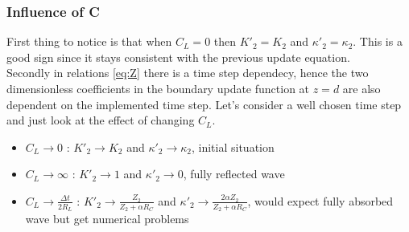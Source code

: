 \subsubsection{Influence of C}

First thing to notice is that when $C_{L} = 0$ then $K'_{2} = K_{2}$ and $\kappa'_{2} = \kappa_{2}$. This is a good
sign since it stays consistent with the previous update equation.\\
Secondly in relations \ref{eq:Z} there is a time step dependecy, hence the two dimensionless
coefficients in the boundary update function at $z=d$ are also dependent on the implemented time step. Let's consider a
well chosen time step and just look at the effect of changing $C_{L}$.
\begin{itemize}
    \item $C_{L} \rightarrow 0$ :
        $K'_{2} \rightarrow K_{2}$ and $\kappa'_{2} \rightarrow \kappa_{2}$, initial situation
    \item $C_{L} \rightarrow \infty$ :
        $ K'_{2} \rightarrow 1$ and $\kappa'_{2} \rightarrow 0$, fully reflected wave
    \item $C_{L} \rightarrow \frac{\Delta t}{2R_{L}}$ :
        $K'_{2} \rightarrow \frac{Z_{2}}{Z_{2}+\alpha R_{C}}$ and $\kappa'_{2} \rightarrow \frac{2\alpha Z_{2}}{Z_{2}+\alpha R_{C}}$, would expect fully absorbed wave but get numerical problems
\end{itemize}

